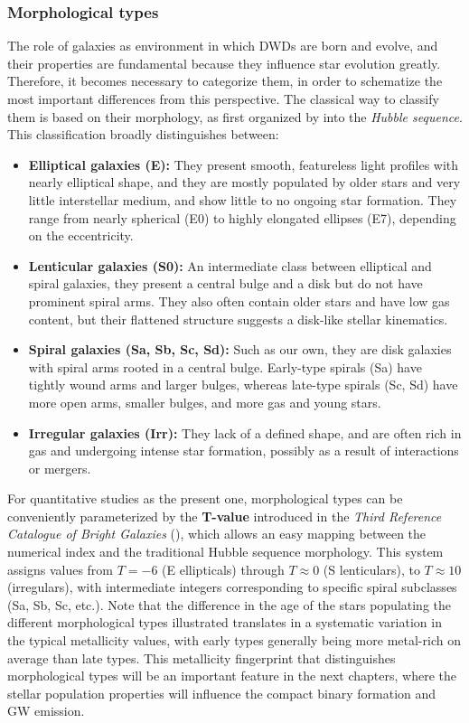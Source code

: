 \subsubsection{Morphological types}
The role of galaxies as environment in which DWDs are born and evolve, and their properties are fundamental because they influence star evolution greatly.
Therefore, it becomes necessary to categorize them, in order to schematize the most important differences from this perspective.
The classical way to classify them is based on their morphology, as first organized by \citet{Hubble1926} into the \textit{Hubble sequence}.  
This classification broadly distinguishes between:
\begin{itemize}
    \item \textbf{Elliptical galaxies (E):} They present smooth, featureless light profiles with nearly elliptical shape, and they are mostly populated by older stars and very little interstellar medium, and show little to no ongoing star formation. 
    They range from nearly spherical (E0) to highly elongated ellipses (E7), depending on the eccentricity. 
    \item \textbf{Lenticular galaxies (S0):} An intermediate class between elliptical and spiral galaxies, they present a central bulge and a disk but do not have prominent spiral arms.
    They also often contain older stars and have low gas content, but their flattened structure suggests a disk-like stellar kinematics.
    \item \textbf{Spiral galaxies (Sa, Sb, Sc, Sd):} Such as our own, they are disk galaxies with spiral arms rooted in a central bulge.
    Early-type spirals (Sa) have tightly wound arms and larger bulges, whereas late-type spirals (Sc, Sd) have more open arms, smaller bulges, and more gas and young stars.
    \item \textbf{Irregular galaxies (Irr):} They lack of a defined shape, and are often rich in gas and undergoing intense star formation, possibly as a result of interactions or mergers.
\end{itemize}
For quantitative studies as the present one, morphological types can be conveniently parameterized by the \textbf{T-value} introduced in the \textit{Third Reference Catalogue of Bright Galaxies} (\citealt{Vaculeurs}), which allows an easy mapping between the numerical index and the traditional Hubble sequence morphology.
This system assigns values from $T=-6$ (E ellipticals) through $T\approx 0$ (S lenticulars), to $T\approx 10$ (irregulars), with intermediate integers corresponding to specific spiral subclasses (Sa, Sb, Sc, etc.).  
Note that the difference in the age of the stars populating the different morphological types illustrated translates in a systematic variation in the typical metallicity values, with early types generally being more metal-rich on average than late types. 
This metallicity fingerprint that distinguishes morphological types will be an important feature in the next chapters, where the stellar population properties will influence the compact binary formation and GW emission.

